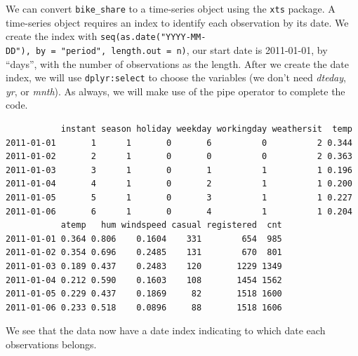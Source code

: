 \documentclass[]{book}
\newenvironment{Shaded}{\begin{snugshade}}{\end{snugshade}}
\newcommand{\DataTypeTok}[1]{\textcolor[rgb]{0.13,0.29,0.53}{#1}}
\newcommand{\DecValTok}[1]{\textcolor[rgb]{0.00,0.00,0.81}{#1}}
\newcommand{\KeywordTok}[1]{\textcolor[rgb]{0.13,0.29,0.53}{\textbf{#1}}}
\newcommand{\NormalTok}[1]{#1}
\newcommand{\OperatorTok}[1]{\textcolor[rgb]{0.81,0.36,0.00}{\textbf{#1}}}
\newcommand{\StringTok}[1]{\textcolor[rgb]{0.31,0.60,0.02}{#1}}
\begin{document}
We can convert \texttt{bike\_share} to a time-series object using the \texttt{xts} package. A time-series object requires an index to identify each observation by its date. We create the index with \texttt{seq(as.date("YYYY-MM-DD"),\ by\ =\ "period",\ length.out\ =\ n)}, our start date is 2011-01-01, by ``days'', with the number of observations as the length. After we create the date index, we will use \texttt{dplyr:select} to choose the variables (we don't need \emph{dteday}, \emph{yr}, or \emph{mnth}). As always, we will make use of the pipe operator to complete the code.

\begin{Shaded}
\end{Shaded}

\begin{verbatim}
           instant season holiday weekday workingday weathersit  temp
2011-01-01       1      1       0       6          0          2 0.344
2011-01-02       2      1       0       0          0          2 0.363
2011-01-03       3      1       0       1          1          1 0.196
2011-01-04       4      1       0       2          1          1 0.200
2011-01-05       5      1       0       3          1          1 0.227
2011-01-06       6      1       0       4          1          1 0.204
           atemp   hum windspeed casual registered  cnt
2011-01-01 0.364 0.806    0.1604    331        654  985
2011-01-02 0.354 0.696    0.2485    131        670  801
2011-01-03 0.189 0.437    0.2483    120       1229 1349
2011-01-04 0.212 0.590    0.1603    108       1454 1562
2011-01-05 0.229 0.437    0.1869     82       1518 1600
2011-01-06 0.233 0.518    0.0896     88       1518 1606
\end{verbatim}

We see that the data now have a date index indicating to which date each observations belongs.
\end{document}
